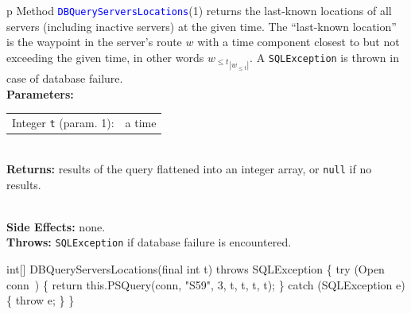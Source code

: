 \begin{tabular}{p{\textwidth}}
\toprule
{}
Method \textcolor{blue}{{\tt{}\protect{}DBQueryServersLocations}}(1) returns the
last-known locations of all servers (including inactive servers) at the given
time. The ``last-known location'' is the waypoint in the server's route $w$
with a time component closest to but not exceeding the given time, in other
words ${w_{\leq t}}_{|w_{\leq t}|}$.
A {\tt{}SQLException} is thrown in case of database failure.\\
\midrule
\textbf{Parameters:} \\
\begin{tabular}{lp{116mm}}
Integer {\tt{}t} (param. 1):&a time
\end{tabular}\\
\textbf{Returns:} results of the query flattened into an integer array, or
{\tt{}null} if no results.

\\
\textbf{Side Effects:} none.\\
\textbf{Throws:} {\tt{}SQLException} if database failure is encountered.\\
\bottomrule
\end{tabular}
\nwenddocs{}\endmoddef{}
int[] DBQueryServersLocations(final int t) throws SQLException \{
  try (\LA{}Open \code{}conn\edoc{}~{\nwtagstyle{}}\RA{}) \{
    return this.PSQuery(conn, "S59", 3, t, t, t, t);
  \} catch (SQLException e) \{
    throw e;
  \}
\}
\eatline
{}\nwendcode{}\nwdocspar
